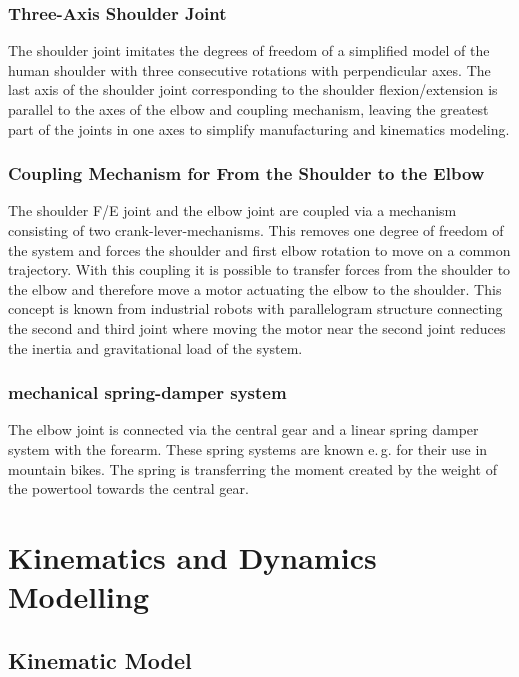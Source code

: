 \documentclass[letterpaper, 10 pt, conference]{ieeeconf}  %
\begin{document}
\subsubsection{Three-Axis Shoulder Joint}

The shoulder joint imitates the degrees of freedom of a simplified model of the human shoulder with three consecutive rotations with perpendicular axes.
The last axis of the shoulder joint corresponding to the shoulder flexion/extension is parallel to the axes of the elbow and coupling mechanism, leaving the greatest part of the joints in one axes to simplify manufacturing and kinematics modeling.

\subsubsection{Coupling Mechanism for From the Shoulder to the Elbow}

The shoulder F/E joint and the elbow joint are coupled via a mechanism consisting of two crank-lever-mechanisms.
This removes one degree of freedom of the system and forces the shoulder and first elbow rotation to move on a common trajectory.
With this coupling it is possible to transfer forces from the shoulder to the elbow and therefore move a motor actuating the elbow to the shoulder.
This concept is known from industrial robots with parallelogram structure connecting the second and third joint where moving the motor near the second joint reduces the inertia and gravitational load of the system.

\subsubsection{mechanical spring-damper system}

The elbow joint is connected via the central gear and a linear spring damper system with the forearm.
These spring systems are known e.\,g. for their use in mountain bikes.
The spring is transferring the moment created by the weight of the powertool towards the central gear.

\section{Kinematics and Dynamics Modelling}

\subsection{Kinematic Model}
\end{document}
